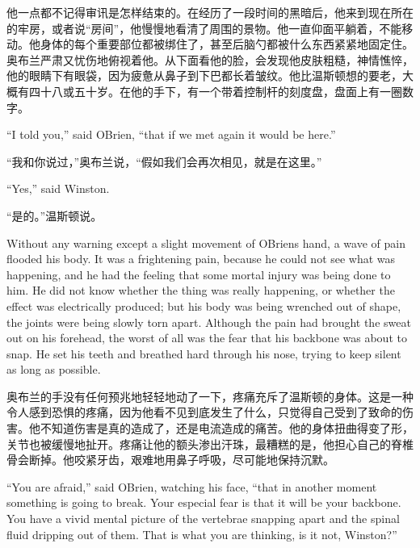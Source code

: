 \begin{paracol}{2}
\switchcolumn

他一点都不记得审讯是怎样结束的。在经历了一段时间的黑暗后，他来到现在所在的牢房，或者说``房间''，他慢慢地看清了周围的景物。他一直仰面平躺着，不能移动。他身体的每个重要部位都被绑住了，甚至后脑勺都被什么东西紧紧地固定住。奥布兰严肃又忧伤地俯视着他。从下面看他的脸，会发现他皮肤粗糙，神情憔悴，他的眼睛下有眼袋，因为疲惫从鼻子到下巴都长着皱纹。他比温斯顿想的要老，大概有四十八或五十岁。在他的手下，有一个带着控制杆的刻度盘，盘面上有一圈数字。

\switchcolumn*

``I told you,'' said O\textquotesingle Brien, ``that if we met again it
would be here.''

\switchcolumn

``我和你说过，''奥布兰说，``假如我们会再次相见，就是在这里。''

\switchcolumn*

``Yes,'' said Winston.

\switchcolumn

``是的。''温斯顿说。

\switchcolumn*

Without any warning except a slight movement of
O\textquotesingle Brien\textquotesingle s hand, a wave of pain flooded
his body. It was a frightening pain, because he could not see what was
happening, and he had the feeling that some mortal injury was being done
to him. He did not know whether the thing was really happening, or
whether the effect was electrically produced; but his body was being
wrenched out of shape, the joints were being slowly torn apart. Although
the pain had brought the sweat out on his forehead, the worst of all was
the fear that his backbone was about to snap. He set his teeth and
breathed hard through his nose, trying to keep silent as long as
possible.

\switchcolumn

奥布兰的手没有任何预兆地轻轻地动了一下，疼痛充斥了温斯顿的身体。这是一种令人感到恐惧的疼痛，因为他看不见到底发生了什么，只觉得自己受到了致命的伤害。他不知道伤害是真的造成了，还是电流造成的痛苦。他的身体扭曲得变了形，关节也被缓慢地扯开。疼痛让他的额头渗出汗珠，最糟糕的是，他担心自己的脊椎骨会断掉。他咬紧牙齿，艰难地用鼻子呼吸，尽可能地保持沉默。

\switchcolumn*

``You are afraid,'' said O\textquotesingle Brien, watching his face, ``that
in another moment something is going to break. Your especial fear is
that it will be your backbone. You have a vivid mental picture of the
vertebrae snapping apart and the spinal fluid dripping out of them. That
is what you are thinking, is it not, Winston?''


\end{paracol}
